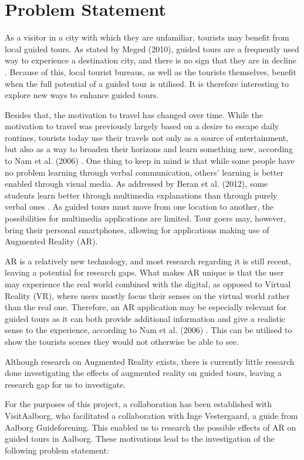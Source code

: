\chapter{Problem Statement}\label{ch:problemstatement}
As a visitor in a city with which they are unfamiliar, tourists may benefit from local guided tours. As stated by Meged (2010), guided tours are a frequently used way to experience a destination city, and there is no sign that they are in decline \cite{Meged2010}. Because of this, local tourist bureaus, as well as the tourists themselves, benefit when the full potential of a guided tour is utilised. It is therefore interesting to explore new ways to enhance guided tours. 

Besides that, the motivation to travel has changed over time. While the motivation to travel was previously largely based on a desire to escape daily routines, tourists today use their travels not only as a source of entertainment, but also as a way to broaden their horizons and learn something new, according to Nam et al. (2006) \cite{Nam2006}. One thing to keep in mind is that while some people have no problem learning through verbal communication, others’ learning is better enabled through visual media. As addressed by Beran et al. (2012), some students learn better through multimedia explanations than through purely verbal ones \cite{Beran2012}. As guided tours must move from one location to another, the possibilities for multimedia applications are limited. Tour goers may, however, bring their personal smartphones, allowing for applications making use of Augmented Reality (AR).

AR is a relatively new technology, and most research regarding it is still recent, leaving a potential for research gaps. What makes AR unique is that the user may experience the real world combined with the digital, as opposed to Virtual Reality (VR), where users mostly focus their senses on the virtual world rather than the real one. Therefore, an AR application may be especially relevant for guided tours as it can both provide additional information and give a realistic sense to the experience, according to Nam et al. (2006) \cite{Nam2006}. This can be utilised to show the tourists scenes they would not otherwise be able to see.

Although research on Augmented Reality exists, there is currently little research done investigating the effects of augmented reality on guided tours, leaving a research gap for us to investigate.

For the purposes of this project, a collaboration has been established with VisitAalborg, who facilitated a collaboration with Inge Vestergaard, a guide from Aalborg Guideforening. This enabled us to research the possible effects of AR on guided tours in Aalborg. These motivations lead to the investigation of the following problem statement:

